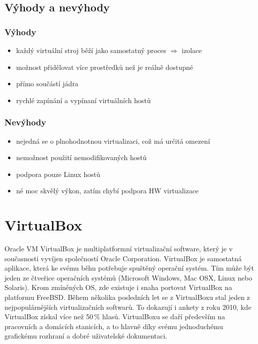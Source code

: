 \subsection{Výhody a nevýhody}
\subsubsection{Výhody}
\begin{itemize}
  \item každý virtuální stroj běží jako samostatný proces $\Rightarrow$ izolace
  \item možnost přidělovat více prostředků než je reálně dostupné
  \item přímo součástí jádra
  \item rychlé zapínání a vypínaní virtuálních hostů
\end{itemize}

\subsubsection{Nevýhody}
\begin{itemize}
  \item nejedná se o plnohodnotnou virtualizaci, což má určitá omezení
  \item nemožnost použití nemodifikovaných hostů
  \item podpora pouze Linux hostů
  \item né moc skvělý výkon, zatím chybí podpora HW virtualizace
\end{itemize}

\section{VirtualBox}
Oracle VM VirtualBox je multiplatformní virtualizační software, který je v současnosti vyvíjen společností Oracle Corporation. VirtualBox je samostatná aplikace, která ke svému běhu potřebuje spuštěný operační systém. Tím může být jeden ze čtveřice operačních systémů (Microsoft Windows, Mac OSX, Linux nebo Solaris). Krom zmíněných OS, zde existuje i snaha portovat VirtualBox na platformu FreeBSD. Během několika posledních let se z VirtualBoxu stal jeden z nejpopulárnějších virtualizačních softwarů. To dokazují i ankety z roku 2010, kde VirtualBox získal více než 50\,\% hlasů. VirtualBoxu se daří především na pracovních a domácích stanicích, a to hlavně díky svému jednoduchému grafickému rozhraní a dobré uživatelské dokumentaci.

